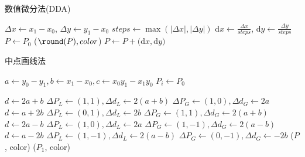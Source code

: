 \documentclass[a4paper]{article}
\begin{document}
\begin{algorithm}
    \caption{数值微分法(DDA)}

    \BlankLine

    $\Delta x \leftarrow x_1 - x_0$, $\Delta y \leftarrow y_1 - x_0$\;
    $steps \leftarrow \max(|\Delta x|, |\Delta y|)$\;
    d$x \leftarrow \frac{\Delta x}{steps}$, d$y \leftarrow \frac{\Delta y}{steps}$\;
    $P \leftarrow P_0$\;
    {
        \putpixel($\round(P), color$)\;
        $P \leftarrow P + ($d$x, $d$y)$\;
    }
\end{algorithm}

\begin{algorithm}
    \caption{中点画线法}

    \BlankLine

    $a\leftarrow y_0-y_1, b\leftarrow x_1-x_0, c\leftarrow x_0y_1-x_1y_0$\;
    $P_i\leftarrow P_0$\;

    {
        $d\leftarrow 2a+b$\;
        $\Delta P_L \leftarrow (1,1), \Delta d_L \leftarrow 2(a+b)$\;
        $\Delta P_G \leftarrow (1,0), \Delta d_G \leftarrow 2a$\;
    }
    {
        $d\leftarrow a+2b$\;
        $\Delta P_L \leftarrow (0,1), \Delta d_L \leftarrow 2b$\;
        $\Delta P_G \leftarrow (1,1), \Delta d_G \leftarrow 2(a+b)$\;
    }
    \uElseIf{$k\in[-1,0)$}
    {
    $d\leftarrow 2a-b$\;
    $\Delta P_L \leftarrow (1,0), \Delta d_L \leftarrow 2a$\;
    $\Delta P_G \leftarrow (1,-1), \Delta d_G \leftarrow 2(a-b)$\;
    }
    \Else
    {
        $d\leftarrow a-2b$\;
        $\Delta P_L \leftarrow (1,-1), \Delta d_L \leftarrow 2(a-b)$\;
        $\Delta P_G \leftarrow (0,-1), \Delta d_G \leftarrow -2b$\;
    }
    {
        \putpixel($P$, color)\;
    }
    \putpixel($P_1$, color)\;
\end{algorithm}
\end{document}
